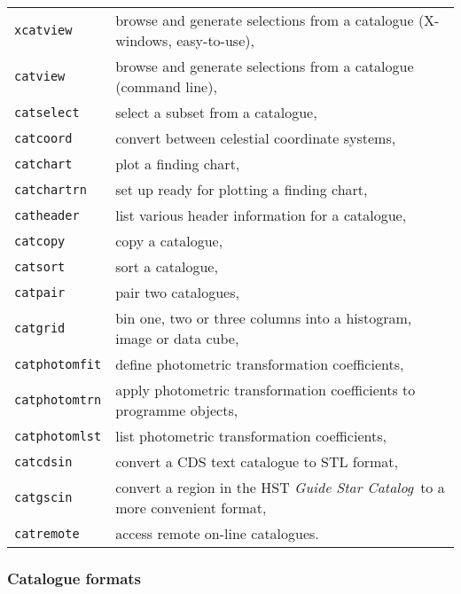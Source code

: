 \documentclass[twoside,11pt]{article}
\renewcommand{\_}{\texttt{\symbol{95}}}
\begin{document}
\begin{tabular}{ll}

{\tt xcatview}     & browse and generate selections from a catalogue
                     (X-windows, easy-to-use), \\
{\tt catview}      & browse and generate selections from a catalogue
                     (command line), \\
{\tt catselect}    & select a subset from a catalogue, \\
{\tt catcoord}     & convert between celestial coordinate systems, \\
{\tt catchart}     & plot a finding chart, \\
{\tt catchartrn}   & set up ready for plotting a finding chart, \\
{\tt catheader}    & list various header information for a catalogue, \\
{\tt catcopy}      & copy a catalogue, \\
{\tt catsort}      & sort a catalogue, \\
{\tt catpair}      & pair two catalogues, \\
{\tt catgrid}      & bin one, two or three columns into a histogram,
                     image or data cube, \\
{\tt catphotomfit} & define photometric transformation coefficients, \\
{\tt catphotomtrn} & apply photometric transformation coefficients to
                     programme objects, \\
{\tt catphotomlst} & list photometric transformation coefficients, \\
{\tt catcdsin}     & convert a CDS text catalogue to STL format, \\
{\tt catgscin}     & convert a region in the HST {\it Guide Star Catalog}\,
                     to a more convenient format, \\
{\tt catremote}    & access remote on-line catalogues. \\
\end{tabular}

\subsubsection*{Catalogue formats}
\end{document}
